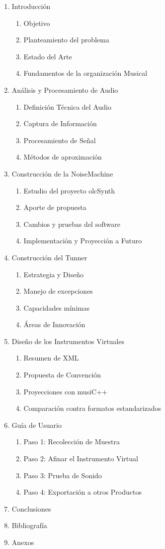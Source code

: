 \documentclass{book}
\begin{document}
	\begin{enumerate}
		\item Introducción
		\begin{enumerate}
			\item Objetivo
			\item Planteamiento del problema
			\item Estado del Arte
			\item Fundamentos de la organización Musical
		\end{enumerate}
		\item Análisis y Procesamiento de Audio
		\begin{enumerate}
			\item Definición Técnica del Audio
			\item Captura de Información
			\item Procesamiento de Señal
			\item Métodos de aproximación
		\end{enumerate}
		\item Construcción de la NoiseMachine
		\begin{enumerate}
			\item Estudio del proyecto olcSynth
			\item Aporte de propuesta
			\item Cambios y pruebas del software
			\item Implementación y Proyección a Futuro
		\end{enumerate}
		\item Construcción del Tunner
		\begin{enumerate}
			\item Estrategia y Diseño
			\item Manejo de excepciones
			\item Capacidades mínimas
			\item Áreas de Innovación
		\end{enumerate}
		\item Diseño de los Instrumentos Virtuales
		\begin{enumerate}
			\item Resumen de XML
			\item Propuesta de Convención
			\item Proyecciones con musiC++
			\item Comparación contra formatos estandarizados
		\end{enumerate}
		\pagebreak\item Guía de Usuario
		\begin{enumerate}
			\item Paso 1: Recolección de Muestra
			\item Paso 2: Afinar el Instrumento Virtual
			\item Paso 3: Prueba de Sonido
			\item Paso 4: Exportación a otros Productos
		\end{enumerate}
		\item Conclusiones
		\item Bibliografía
		\item Anexos
	\end{enumerate}
\end{document}
